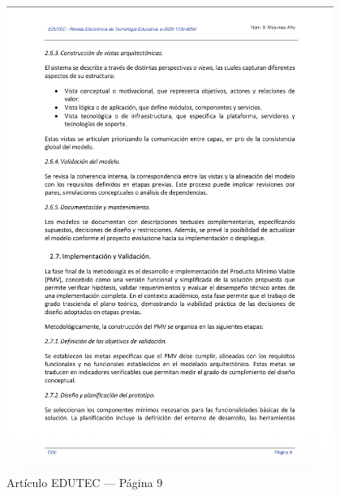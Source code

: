 \begin{figure}[H]
    \centering
    \begin{tcolorbox}[
        colback=white,
        colframe=gray!50,
        boxrule=1pt,
        arc=2pt,
        boxsep=5pt,
        left=3pt,
        right=3pt,
        top=3pt,
        bottom=3pt,
        drop shadow
    ]
        \includegraphics[width=0.95\textwidth,keepaspectratio]{apendices/EDUTEC/9.png}
    \end{tcolorbox}
    \caption{Artículo EDUTEC --- Página 9}\label{fig:edutec-pagina-9}
\end{figure}
\FloatBarrier

